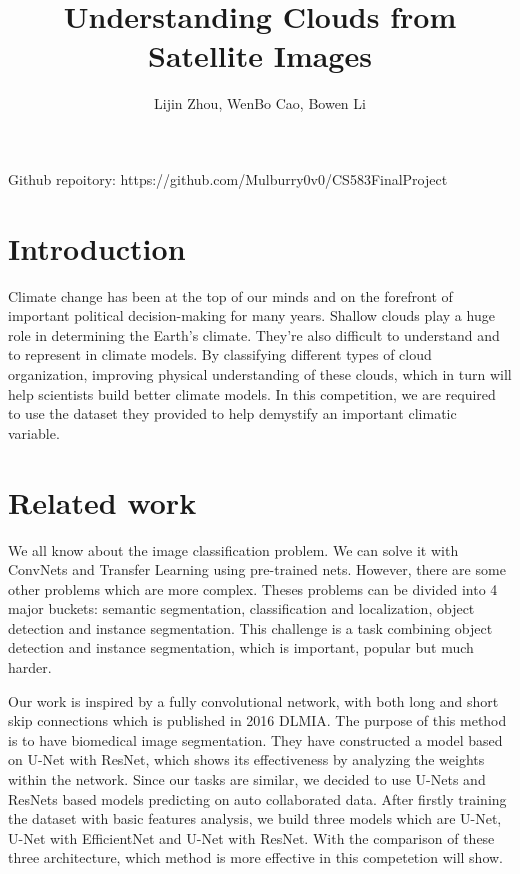 \documentclass[UTF8]{article}
\title{Understanding Clouds from Satellite Images}
\author{Lijin Zhou, WenBo Cao, Bowen Li}
\begin{document}
\maketitle

Github repoitory: https://github.com/Mulburry0v0/CS583FinalProject

\section{Introduction}
Climate change has been at the top of our minds and on the forefront of important political decision-making for many years. Shallow clouds play a huge role in determining the Earth's climate. They’re also difficult to understand and to represent in climate models. By classifying different types of cloud organization, improving physical understanding of these clouds, which in turn will help scientists build better climate models. In this competition, we are required to use the dataset they provided to help demystify an important climatic variable. 

\section{Related work}
We all know about the image classification problem. We can solve it with ConvNets and Transfer Learning using pre-trained nets. However, there are some other problems which are more complex. Theses problems can be divided into 4 major buckets: semantic segmentation, classification and localization, object detection and instance segmentation. This challenge is a task combining object detection and instance segmentation, which is important, popular but much harder. \par
\noindent Our work is inspired by a fully convolutional network, with both long and short skip connections which is published in 2016 DLMIA. The purpose of this method is to have biomedical image segmentation. They have constructed a model based on U-Net with ResNet, which shows its effectiveness by analyzing the weights within the network. Since our tasks are similar, we decided to use U-Nets and ResNets based models predicting on auto collaborated data. After firstly training the dataset with basic features analysis, we build three models which are U-Net, U-Net with EfficientNet and U-Net with ResNet. With the comparison of these three architecture, which method is more effective in this competetion will show.
 
\end{document}
